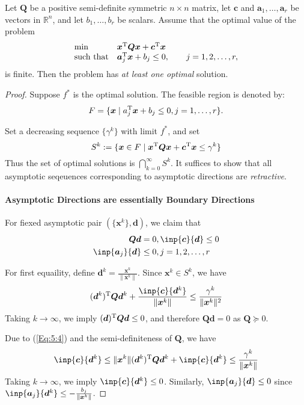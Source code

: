 \begin{theorem}
Let $\bm Q$ be a positive semi-definite symmetric $n\times n$ matrix, let $\bm c$ and $\bm a_1,\dots,\bm a_r$ be vectors in $\mathbb{R}^n$, and let $b_1,\dots,b_r$ be scalars. Assume that the optimal value of the problem
\begin{equation}
\begin{array}{ll}
\min&\bm x^{\mathrm T}\bm Q\bm x+\bm c^{\mathrm T}\bm x\\
\mbox{such that}&\bm a_j^{\mathrm T}\bm x+b_j\le0,\qquad j=1,2,\dots,r,
\end{array}
\end{equation}
is finite. Then the problem has \emph{at least one optimal} solution.
\end{theorem}
\begin{proof}
Suppose $f^*$ is the optimal solution. The feasible region is denoted by:
\[
F=\{\bm x \mid a_j^{\mathrm T}\bm x+b_j\le0,j=1,\dots,r\}.
\] 

Set a decreasing sequence $\{\gamma^k\}$ with limit $f^*$, and set
\[
S^k:=\{\bm x\in F\mid \bm x^{\mathrm T}\bm Q\bm x+\bm c^{\mathrm T}\bm x\le\gamma^k\}
\]
Thus the set of optimal solutions is $\bigcap_{k=0}^\infty S^k$. It suffices to show that all asymptotic seqeuences corresponding to asymptotic directions are \emph{retractive}.

\paragraph{Asymptotic Directions are essentially Boundary Directions} For fiexed asymptotic pair $(\{\bm x^k\},\bm d)$, we claim that 
\begin{align}
\bm Q\bm d&=0,\inp{\bm c}{\bm d}\le0\\
\inp{\bm a_j}{\bm d}&\le0, j=1,2,\dots,r
\end{align}

For first equaility, define $\bm d^k=\frac{\bm x^k}{\|\bm x^k\|}$. Since $\bm x^k\in S^k$, we have
\begin{equation}
(\bm d^k)\trans\bm Q\bm d^k+\frac{\inp{\bm c}{\bm d^k}}{\|\bm x^k\|}\le\frac{\gamma^k}{\|\bm x^k\|^2}\label{Eq:5:4}
\end{equation}
Taking $k\to\infty$, we imply $(\bm d)^{\mathrm T}\bm Q\bm d\le0$, and therefore $\bm{Qd}=0$ as $\bm Q\succeq0$.

Due to (\ref{Eq:5:4}) and the semi-definiteness of $\bm Q$, we have
\[
\inp{\bm c}{\bm d^k}\le 
\|\bm x^k\|(\bm d^k)\trans\bm Q\bm d^k+\inp{\bm c}{\bm d^k}\le\frac{\gamma^k}{\|\bm x^k\|}
\]
Taking $k\to\infty$, we imply $\inp{\bm c}{\bm d^k}\le0$. Similarly, $\inp{\bm a_j}{\bm d}\le0$ since $\inp{\bm a_j}{\bm d^k}\le-\frac{b_j}{\|\bm x^k\|}$.

\end{proof}

